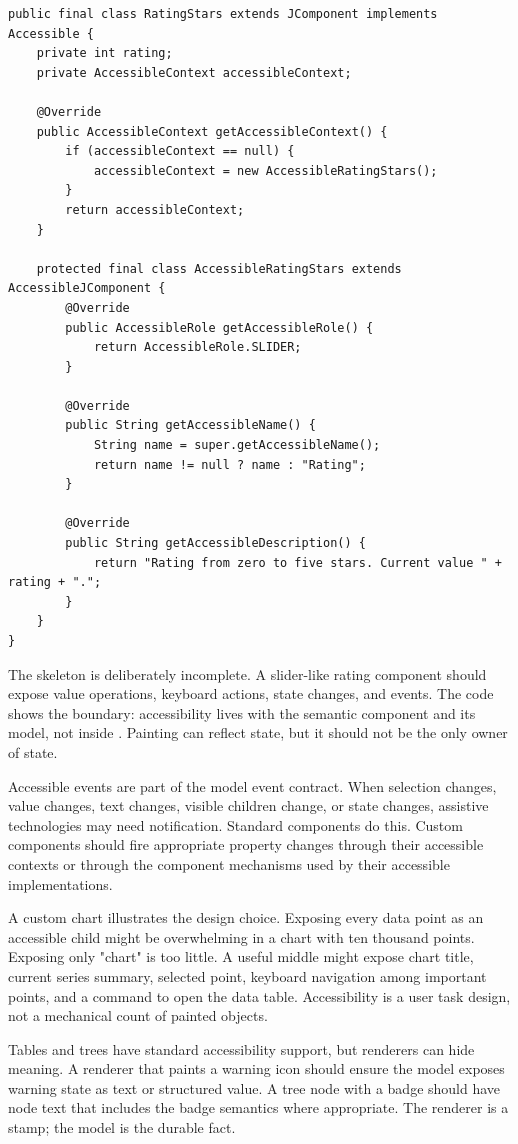 \begin{lstlisting}[caption={Skeleton of a custom accessible component.}]
public final class RatingStars extends JComponent implements Accessible {
    private int rating;
    private AccessibleContext accessibleContext;

    @Override
    public AccessibleContext getAccessibleContext() {
        if (accessibleContext == null) {
            accessibleContext = new AccessibleRatingStars();
        }
        return accessibleContext;
    }

    protected final class AccessibleRatingStars extends AccessibleJComponent {
        @Override
        public AccessibleRole getAccessibleRole() {
            return AccessibleRole.SLIDER;
        }

        @Override
        public String getAccessibleName() {
            String name = super.getAccessibleName();
            return name != null ? name : "Rating";
        }

        @Override
        public String getAccessibleDescription() {
            return "Rating from zero to five stars. Current value " + rating + ".";
        }
    }
}
\end{lstlisting}

The skeleton is deliberately incomplete. A slider-like rating component should expose value operations, keyboard actions, state changes, and events. The code shows the boundary: accessibility lives with the semantic component and its model, not inside . Painting can reflect state, but it should not be the only owner of state.

Accessible events are part of the model event contract. When selection changes, value changes, text changes, visible children change, or state changes, assistive technologies may need notification. Standard components do this. Custom components should fire appropriate property changes through their accessible contexts or through the component mechanisms used by their accessible implementations.

A custom chart illustrates the design choice. Exposing every data point as an accessible child might be overwhelming in a chart with ten thousand points. Exposing only "chart" is too little. A useful middle might expose chart title, current series summary, selected point, keyboard navigation among important points, and a command to open the data table. Accessibility is a user task design, not a mechanical count of painted objects.

Tables and trees have standard accessibility support, but renderers can hide meaning. A renderer that paints a warning icon should ensure the model exposes warning state as text or structured value. A tree node with a badge should have node text that includes the badge semantics where appropriate. The renderer is a stamp; the model is the durable fact.

